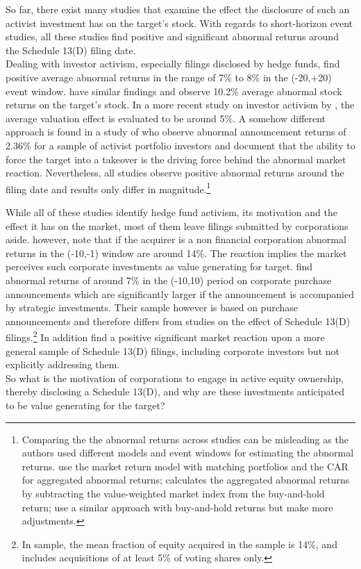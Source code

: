 \documentclass[12pt]{article}
\begin{document}
So far, there exist many studies that examine the effect the disclosure of such an activist investment has on the target's stock. With regards to short-horizon event studies, all these studies find positive and significant abnormal returns around the Schedule 13(D) filing date.\\ 
Dealing with investor activism, especially filings disclosed by hedge funds, \citet[p.1730]{Brav2008} find positive average abnormal returns in the range of 7\% to 8\% in the (-20,+20) event window. \citet[p.188]{Klein2009} have similar findings and observe 10.2\% average abnormal stock returns on the target's stock. In a more recent study on investor activism by \citet[p.410]{Denes2017}, the average valuation effect is evaluated to be around 5\%. A somehow different approach is found in a study of \citet[p.363]{Greenwood2009} who observe abnormal announcement returns of 2.36\% for a sample of activist portfolio investors and document that the ability to force the target into a takeover is the driving force behind the abnormal market reaction. Nevertheless, all studies observe positive abnormal returns around the filing date and results only differ in magnitude.\footnote{Comparing the the abnormal returns across studies can be misleading as the authors used different models and event windows for estimating the abnormal returns. \citet{Greenwood2009} use the market return model with matching portfolios and the CAR for aggregated abnormal returns; \citet{Brav2008} calculates the aggregated abnormal returns by subtracting the value-weighted market index from the buy-and-hold return; \citet{Klein2009} use a similar approach with buy-and-hold returns but make more adjustments.}

While all of these studies identify hedge fund activism, its motivation and the effect it has on the market, most of them leave filings submitted by corporations aside. \citet[p.29]{Brigida2012} however, note that if the acquirer is a non financial corporation abnormal returns in the (-10,-1) window are around 14\%. The reaction implies the market perceives such corporate investments as value generating for target. \citet[p.2803]{Allen2000} find abnormal returns of around 7\% in the (-10,10) period on corporate purchase announcements which are significantly larger if the announcement is accompanied by strategic investments. Their sample however is based on purchase announcements and therefore differs from studies on the effect of Schedule 13(D) filings.\footnote{In \citet[p.2801]{Allen2000} sample, the mean fraction of equity acquired in the sample is 14\%, and includes acquisitions of at least 5\% of voting shares only.} In addition \citet{Collin-Dufresne2015} find a positive significant market reaction upon a more general sample of Schedule 13(D) filings, including corporate investors but not explicitly addressing them.\\
So what is the motivation of corporations to engage in active equity ownership, thereby disclosing a Schedule 13(D), and why are these investments anticipated to be value generating for the target?
\end{document}
